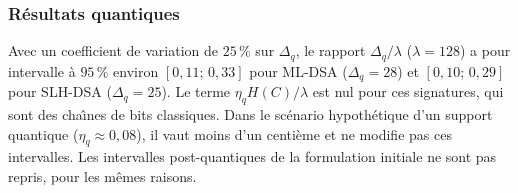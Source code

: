 \begin{sloppypar}
\subsubsection{R\'esultats quantiques}
\label{subsec:resultats_quantiques_bootstrap}

Avec un coefficient de variation de $25\,\%$ sur $\Delta_q$, le rapport
$\Delta_q/\lambda$ ($\lambda = 128$) a pour intervalle \`a $95\,\%$ environ
$[0{,}11;\,0{,}33]$ pour ML-DSA ($\Delta_q = 28$) et $[0{,}10;\,0{,}29]$ pour SLH-DSA
($\Delta_q = 25$). Le terme $\eta_q H(C)/\lambda$ est nul pour ces signatures,
qui sont des cha\^{\i}nes de bits classiques. Dans le sc\'enario hypoth\'etique
d'un support quantique ($\eta_q \approx 0{,}08$), il vaut moins d'un centi\`eme
et ne modifie pas ces intervalles. Les intervalles post-quantiques de
la formulation initiale ne sont pas repris, pour les m\^emes raisons.
\end{sloppypar}

